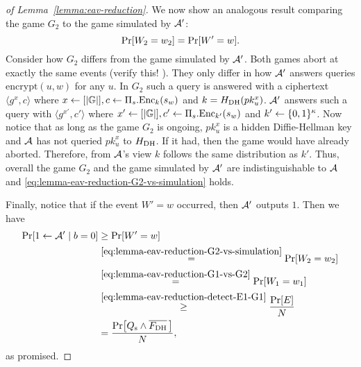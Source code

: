\begin{proof}[of Lemma~\ref{lemma:eav-reduction}]
	We now show an analogous result comparing the game $G_2$ to the game simulated by $\mathcal{A}'$:
	\begin{equation} \label{eq:lemma-eav-reduction-G2-vs-simulation}
		\pr{W_2 = w_2} = \pr{W' = w}.
	\end{equation}
	Consider how $G_2$ differs from the game simulated by $\mathcal{A}'$. Both games abort at exactly the same events (verify this! ). They only differ in how $\mathcal{A}'$ answers queries $\mathrm{encrypt}(u, w)$ for any $u$. In $G_2$ such a query is answered with a ciphertext $\langle g^x, c \rangle$ where $x \leftarrow [\lvert\mathbb{G}\rvert], c \leftarrow \Pi_s.\mathrm{Enc}_k(s_w)$ and $k = H_\mathrm{DH}(pk_u^x)$. $\mathcal{A}'$ answers such a query with $\langle g^{x'}, c' \rangle$ where $x' \leftarrow [\lvert\mathbb{G}\rvert], c' \leftarrow \Pi_s.\mathrm{Enc}_{k'}(s_w)$ and $k' \leftarrow \{0, 1\}^\kappa$. Now notice that as long as the game $G_2$ is ongoing, $pk_u^{x}$ is a hidden Diffie-Hellman key and $\mathcal{A}$ has not queried $pk_u^{x}$ to $H_\mathrm{DH}$. If it had, then the game would have already aborted. Therefore, from $\mathcal{A}$'s view $k$ follows the same distribution as $k'$. Thus, overall the game $G_2$ and the game simulated by $\mathcal{A}'$ are indistinguishable to $\mathcal{A}$ and \eqref{eq:lemma-eav-reduction-G2-vs-simulation} holds.

	Finally, notice that if the event $W' = w$ occurred, then $\mathcal{A}'$ outputs $1$. Then we have
	\begin{align*}
		\pr{1 \from \adv' \mid b = 0} & \ge \pr{W' = w}                                                              \\
		                              & \stackrel{\eqref{eq:lemma-eav-reduction-G2-vs-simulation}}{=} \pr{W_2 = w_2} \\
		                              & \stackrel{\eqref{eq:lemma-eav-reduction-G1-vs-G2}}{=}  \pr{W_1 = w_1}        \\
		                              & \stackrel{\eqref{eq:lemma-eav-reduction-detect-E1-G1}}{\ge} \frac{\pr{E}}{N} \\
		                              & = \frac{\pr{\qs \land \overline{\fdh}\,}}{N},
	\end{align*}
	as promised.


\end{proof}
